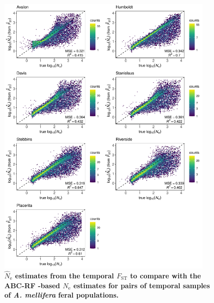 \documentclass[a4paper, 12pt]{article}
\begin{document}
\begin{figure}[ht]
  \centering
  \includegraphics[width=0.95\textwidth]{Figures/FigureS25_combined_plot_fstNE.pdf}
  \small\caption{\textbf{$\hat N_{\mathrm{e}}$ estimates from the temporal $F_{\mathrm{ST}}$ to compare with the ABC-RF -based $\hat N_{\mathrm{e}}$ estimates for pairs of temporal samples of \textit{A. mellifera} feral populations.}}
  \label{fig:supple_feralbee_fstne}
\end{figure}
\end{document}
